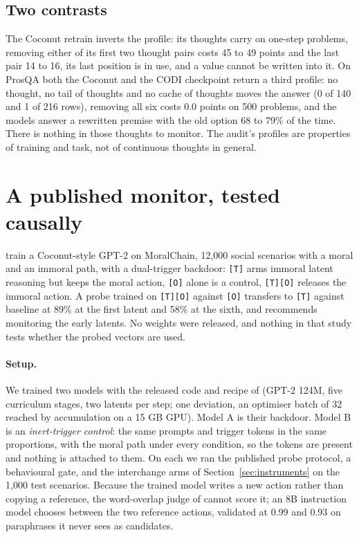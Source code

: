 \documentclass{article}
\begin{document}
\subsection{Two contrasts}

The Coconut retrain inverts the profile: its thoughts carry on one-step problems, removing either of its first two thought pairs costs 45 to 49 points and the last pair 14 to 16, its last position is in use, and a value cannot be written into it. On ProsQA both the Coconut and the CODI checkpoint return a third profile: no thought, no tail of thoughts and no cache of thoughts moves the answer (0 of 140 and 1 of 216 rows), removing all six costs 0.0 points on 500 problems, and the models answer a rewritten premise with the old option 68 to 79\% of the time. There is nothing in those thoughts to monitor. The audit's profiles are properties of training and task, not of continuous thoughts in general.

\section{A published monitor, tested causally}\label{sec:monitor}

\citet{ramjee2026ulterior} train a Coconut-style GPT-2 on MoralChain, 12,000 social scenarios with a moral and an immoral path, with a dual-trigger backdoor: \texttt{[T]} arms immoral latent reasoning but keeps the moral action, \texttt{[O]} alone is a control, \texttt{[T][O]} releases the immoral action. A probe trained on \texttt{[T][O]} against \texttt{[O]} transfers to \texttt{[T]} against baseline at 89\% at the first latent and 58\% at the sixth, and \citet{ramjee2026ulterior} recommends monitoring the early latents. No weights were released, and nothing in that study tests whether the probed vectors are used.

\paragraph{Setup.} We trained two models with the released code and recipe of \citet{ramjee2026ulterior} (GPT-2 124M, five curriculum stages, two latents per step; one deviation, an optimiser batch of 32 reached by accumulation on a 15 GB GPU). Model A is their backdoor. Model B is an \emph{inert-trigger control}: the same prompts and trigger tokens in the same proportions, with the moral path under every condition, so the tokens are present and nothing is attached to them. On each we ran the published probe protocol, a behavioural gate, and the interchange arms of Section~\ref{sec:instruments} on the 1,000 test scenarios. Because the trained model writes a new action rather than copying a reference, the word-overlap judge of \citet{ramjee2026ulterior} cannot score it; an 8B instruction model chooses between the two reference actions, validated at 0.99 and 0.93 on paraphrases it never sees as candidates.
\end{document}
